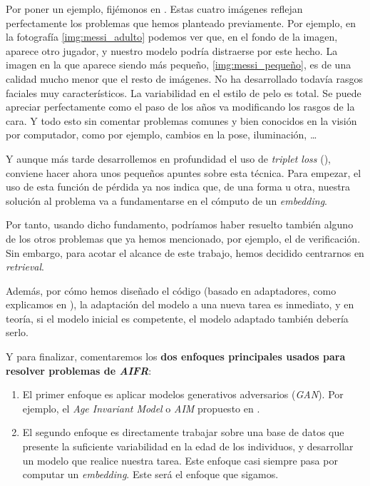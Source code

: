 Por poner un ejemplo, fijémonos en  \footnotemark. Estas cuatro imágenes reflejan perfectamente los problemas que hemos planteado previamente. Por ejemplo, en la fotografía \ref{img:messi_adulto} podemos ver que, en el fondo de la imagen, aparece otro jugador, y nuestro modelo podría distraerse por este hecho. La imagen en la que aparece siendo más pequeño, \ref{img:messi_pequeño}, es de una calidad mucho menor que el resto de imágenes. No ha desarrollado todavía rasgos faciales muy característicos. La variabilidad en el estilo de pelo es total. Se puede apreciar perfectamente como el paso de los años va modificando los rasgos de la cara. Y todo esto sin comentar problemas comunes y bien conocidos en la visión por computador, como por ejemplo, cambios en la pose, iluminación, \ldots
{}

Y aunque más tarde desarrollemos en profundidad el uso de \textit{triplet loss} (), conviene hacer ahora unos pequeños apuntes sobre esta técnica. Para empezar, el uso de esta función de pérdida ya nos indica que, de una forma u otra, nuestra solución al problema va a fundamentarse en el cómputo de un \textit{embedding}.

Por tanto, usando dicho fundamento, podríamos haber resuelto también alguno de los otros problemas que ya hemos mencionado, por ejemplo, el de verificación. Sin embargo, para acotar el alcance de este trabajo, hemos decidido centrarnos en \textit{retrieval}.

Además, por cómo hemos diseñado el código (basado en adaptadores, como explicamos en ), la adaptación del modelo a una nueva tarea es inmediato, y en teoría, si el modelo inicial es competente, el modelo adaptado también debería serlo.

Y para finalizar, comentaremos los \textbf{dos enfoques principales usados para resolver problemas de \textit{AIFR}}:

\begin{enumerate}
    \item El primer enfoque es aplicar modelos generativos adversarios (\textit{GAN}). Por ejemplo, el \textit{Age Invariant Model} o \textit{AIM} propuesto en \cite{informatica:tecnica_sintesis_aifr}.
    \item El segundo enfoque es directamente trabajar sobre una base de datos que presente la suficiente variabilidad en la edad de los individuos, y desarrollar un modelo que realice nuestra tarea. Este enfoque casi siempre pasa por computar un \textit{embedding}. Este será el enfoque que sigamos.
\end{enumerate}

